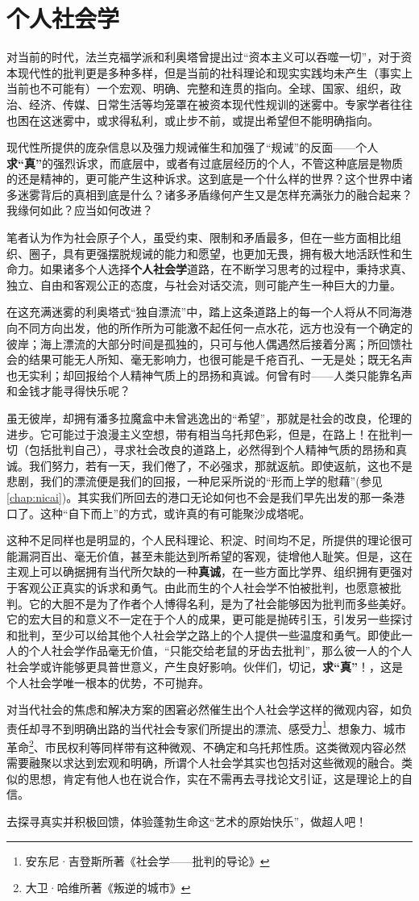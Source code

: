 \chapter{个人社会学}
\label{chap:gerenshehuixue}

对当前的时代，法兰克福学派和利奥塔曾提出过“资本主义可以吞噬一切”，对于资本现代性的批判更是多种多样，但是当前的社科理论和现实实践均未产生（事实上当前也不可能有）一个宏观、明确、完整和连贯的指向。全球、国家、组织，政治、经济、传媒、日常生活等均笼罩在被资本现代性规训的迷雾中。专家学者往往也困在这迷雾中，或求得私利，或止步不前，或提出希望但不能明确指向。

现代性所提供的庞杂信息以及强力规诫催生和加强了“规诫”的反面——个人\textbf{求“真”}的强烈诉求，而底层中，或者有过底层经历的个人，不管这种底层是物质的还是精神的，更可能产生这种诉求。这到底是一个什么样的世界？这个世界中诸多迷雾背后的真相到底是什么？诸多矛盾缘何产生又是怎样充满张力的融合起来？我缘何如此？应当如何改进？

笔者认为作为社会原子个人，虽受约束、限制和矛盾最多，但在一些方面相比组织、圈子，具有更强摆脱规诫的能力和愿望，也更加无畏，拥有极大地活跃性和生命力。如果诸多个人选择\textbf{个人社会学}道路，在不断学习思考的过程中，秉持求真、独立、自由和客观公正的态度，与社会对话交流，则可能产生一种巨大的力量。

在这充满迷雾的利奥塔式“独自漂流”中，踏上这条道路上的每一个人将从不同海港向不同方向出发，他的所作所为可能激不起任何一点水花，远方也没有一个确定的彼岸；海上漂流的大部分时间是孤独的，只可与他人偶遇然后接着分离；所回馈社会的结果可能无人所知、毫无影响力，也很可能是千疮百孔、一无是处；既无名声也无实利；却回报给个人精神气质上的昂扬和真诚。何曾有时——人类只能靠名声和金钱才能寻得快乐呢？

虽无彼岸，却拥有潘多拉魔盒中未曾逃逸出的“希望”，那就是社会的改良，伦理的进步。它可能过于浪漫主义空想，带有相当乌托邦色彩，但是，在路上！在批判一切（包括批判自己），寻求社会改良的道路上，必然得到个人精神气质的昂扬和真诚。我们努力，若有一天，我们倦了，不必强求，那就返航。即使返航，这也不是悲剧，我们的漂流便是我们的回报，一种尼采所说的“形而上学的慰藉”(参见\cref{chap:nicai})。其实我们所回去的港口无论如何也不会是我们早先出发的那一条港口了。这种“自下而上”的方式，或许真的有可能聚沙成塔呢。

这种不足同样也是明显的，个人民科理论、积淀、时间均不足，所提供的理论很可能漏洞百出、毫无价值，甚至未能达到所希望的客观，徒增他人耻笑。但是，这在主观上可以确据拥有当代所欠缺的一种\textbf{真诚}，在一些方面比学界、组织拥有更强对于客观公正真实的诉求和勇气。由此而生的个人社会学不怕被批判，也愿意被批判。它的大胆不是为了作者个人博得名利，是为了社会能够因为批判而多些美好。它的宏大目的和意义不一定在于个人的成果，更可能是抛砖引玉，引发另一些探讨和批判，至少可以给其他个人社会学之路上的个人提供一些温度和勇气。即使此一人的个人社会学作品毫无价值，“只能交给老鼠的牙齿去批判”，那么彼一人的个人社会学或许能够更具普世意义，产生良好影响。伙伴们，切记，\textbf{求“真”}！，这是个人社会学唯一根本的优势，不可抛弃。

对当代社会的焦虑和解决方案的困窘必然催生出个人社会学这样的微观内容，如负责任却寻不到明确出路的当代社会专家们所提出的漂流、感受力\footnote{安东尼·吉登斯所著《社会学——批判的导论》}、想象力、城市革命\footnote{大卫·哈维所著《叛逆的城市》}、市民权利等同样带有这种微观、不确定和乌托邦性质。这类微观内容必然需要融聚以求达到宏观和明确，所谓个人社会学其实也包括对这些微观的融合。类似的思想，肯定有他人也在说合作，实在不需再去寻找论文引证，这是理论上的自信。

去探寻真实并积极回馈，体验蓬勃生命这“艺术的原始快乐”，做超人吧！

